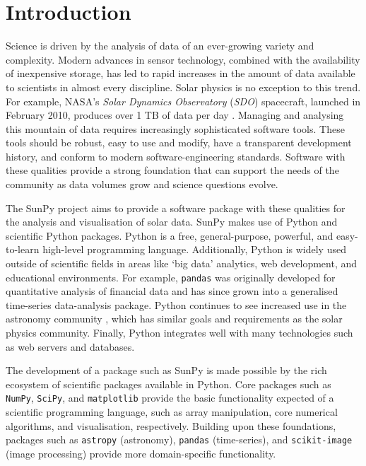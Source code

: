 \section{Introduction}\label{sec:Intro}

Science is driven by the analysis of data of an ever-growing variety and 
complexity.
Modern advances in sensor technology, combined with the availability of 
inexpensive 
storage, has led to rapid increases in the amount of data available to scientists in almost
every discipline.  Solar physics is no exception to this trend. For example,
NASA's \textit{Solar Dynamics Observatory} (\textit{SDO}) spacecraft, launched
in February 2010, produces over 1 TB of data per day \citep{aia}. Managing and
analysing this mountain of data requires increasingly sophisticated software
tools. These tools should be robust, easy to use and modify, have a transparent
development history, and conform to modern software-engineering
standards. Software with these qualities provide a strong foundation that can support the
needs of the community as data volumes grow and science questions evolve.

The SunPy project aims to provide a software package with these qualities for 
the analysis and visualisation of solar data. SunPy makes
use of Python and scientific Python packages. Python is a free, general-purpose, 
powerful, and easy-to-learn high-level programming language. Additionally, Python is 
widely used outside of scientific fields in areas like `big data' analytics, web 
development, and educational environments. For example, \texttt{pandas} was 
originally developed for quantitative analysis of financial data and has since 
grown into a generalised time-series data-analysis package. Python continues to 
see increased use in the astronomy community \citep{greenfield2011}, which has 
similar goals and requirements as the solar physics community. Finally, Python 
integrates well with many technologies such as web servers \citep{dolgert2008} and databases. 

The development of a package such as SunPy is made possible by the rich ecosystem of 
scientific packages available in Python. Core packages such as \texttt{NumPy}, 
\texttt{SciPy}, and \texttt{matplotlib} provide the basic functionality expected of a 
scientific programming language,
such as array manipulation, core numerical algorithms, and visualisation, respectively.
Building upon these foundations, packages such as \texttt{astropy} (astronomy), \texttt{pandas} (time-series), and
\texttt{scikit-image} (image processing) provide more domain-specific functionality.

